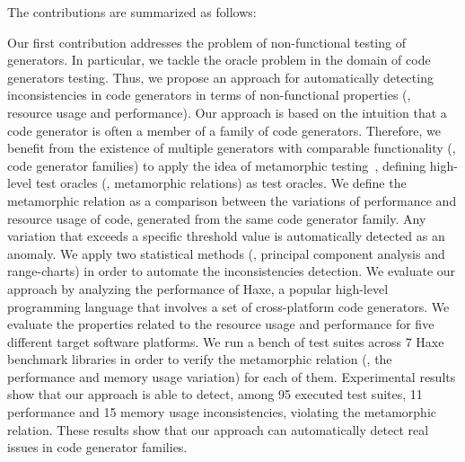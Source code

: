 The contributions are summarized as follows: 

Our first contribution addresses the problem of non-functional testing of generators. In particular, we tackle the oracle problem in the domain of code generators testing. Thus, we propose an approach for automatically detecting inconsistencies in code generators in terms of non-functional properties (\ie, resource usage and performance).
Our approach is based on the intuition that a code generator is often a member of a family of code generators. Therefore, we benefit from the existence of multiple generators with comparable functionality (\ie, code generator families) to apply the idea of metamorphic testing~\cite{zhou2004metamorphic}, defining high-level test oracles (\ie, metamorphic relations) as test oracles. 
We define the metamorphic relation as a comparison between the variations of performance and resource usage of code, generated from the same code generator family. Any variation that exceeds a specific threshold value is automatically detected as an anomaly. We apply two statistical methods (\ie, principal component analysis and range-charts) in order to automate the inconsistencies detection.
We evaluate our approach by analyzing the performance of Haxe, a popular high-level programming language that involves a set of cross-platform code generators. We evaluate the properties related to the resource usage and performance for five different target software platforms. 
We run a bench of test suites across 7 Haxe benchmark libraries in order to verify the metamorphic relation (\ie, the performance and memory usage variation) for each of them. Experimental results show that our approach is able to detect, among 95 executed test suites, 11 performance and 15 memory usage inconsistencies, violating the metamorphic relation. These results show that our approach can automatically detect real issues in code generator families.

